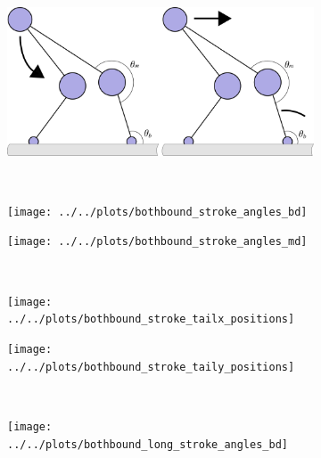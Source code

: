 \documentclass[9pt,twocolumn,twoside]{article}
\begin{document}
\begin{figure}[tbhp]
  \centering
  \begin{subfigure}[]{0.8\columnwidth}\caption{}\vspace{5pt}\includegraphics[width=\columnwidth]{figures/winch-powerstroke-cartoon}\end{subfigure}\vspace{10pt}\\
  \begin{subfigure}[]{0.5\columnwidth}\caption{}\texttt{[image: ../../plots/bothbound\_stroke\_angles\_bd]}\end{subfigure}%
  \begin{subfigure}[]{0.5\columnwidth}\caption{}\texttt{[image: ../../plots/bothbound\_stroke\_angles\_md]}\end{subfigure}\\
  \begin{subfigure}[]{0.5\columnwidth}\caption{}\texttt{[image: ../../plots/bothbound\_stroke\_tailx\_positions]}\end{subfigure}%
  \begin{subfigure}[]{0.5\columnwidth}\caption{}\texttt{[image: ../../plots/bothbound\_stroke\_taily\_positions]}\end{subfigure}\\
  \begin{subfigure}[]{0.5\columnwidth}\caption{}\texttt{[image: ../../plots/bothbound\_long\_stroke\_angles\_bd]}\end{subfigure}

\end{figure}
\end{document}
